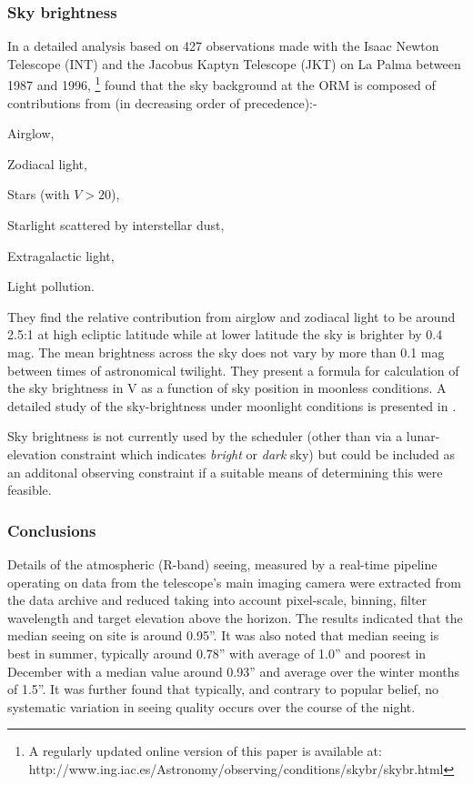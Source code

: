 {{\subsubsection{Sky brightness}
In a detailed analysis based on 427 observations made with the Isaac Newton Telescope (INT) and the Jacobus Kaptyn Telescope (JKT) on La Palma between 1987 and 1996, \citet{lapalma115} \footnote{A regularly updated online version of this paper is available at: http://www.ing.iac.es/Astronomy/observing/conditions/skybr/skybr.html} found that the sky background at the ORM is composed of contributions from (in decreasing order of precedence):-
\begin{inparaenum} \item Airglow, \item Zodiacal light, \item Stars (with $V > 20$), \item Starlight scattered by interstellar dust, \item Extragalactic light, \item Light pollution.
\end{inparaenum}

 They find the relative contribution from airglow and zodiacal light to be around 2.5:1 at high ecliptic latitude while at lower latitude the sky is brighter by 0.4 mag. The mean brightness across the sky does not vary by more than 0.1 mag between times of astronomical twilight. They present a formula for calculation of the sky brightness in V as a function of sky position in moonless conditions. A detailed study of the sky-brightness under moonlight conditions is presented in \citet{krisciunas91brightness}.

Sky brightness is not currently used by the scheduler (other than via a lunar-elevation constraint which indicates \emph{bright} or \emph{dark} sky) but could be included as an additonal observing constraint if a suitable means of determining this were feasible.

\subsubsection{Conclusions}
Details of the atmospheric (R-band) seeing, measured by a real-time pipeline operating on data from the telescope's main imaging camera were extracted from the data archive and reduced taking into account pixel-scale, binning, filter wavelength and target elevation above the horizon. The results indicated that the median seeing on site is around 0.95''. It was also noted that median seeing is best in summer, typically around 0.78'' with average of 1.0'' and poorest in December with a median value around 0.93'' and average over the winter months of 1.5''. It was further found that typically, and contrary to popular belief, no systematic variation in seeing quality occurs over the course of the night.



}}
